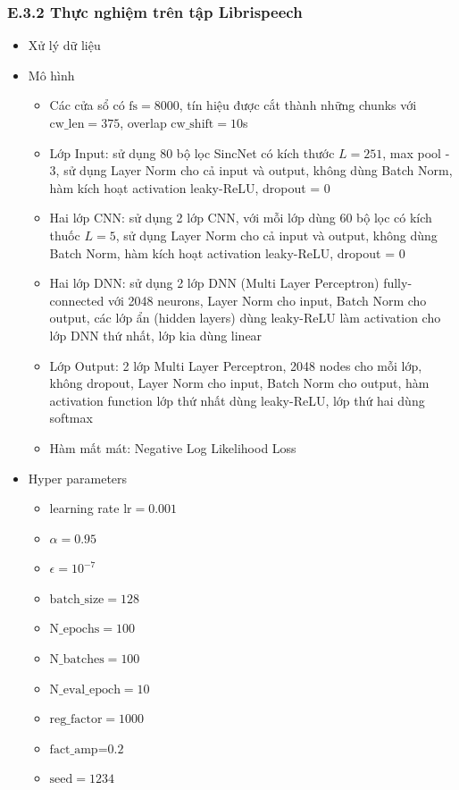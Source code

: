 \documentclass{article}
\begin{document}
	\subsubsection{E.3.2 Thực nghiệm trên tập Librispeech}
	\begin{itemize}
		\item Xử lý dữ liệu
		\item Mô hình 
		\begin{itemize}
			\item Các cửa sổ có $\text{fs} = 8000$, tín hiệu được cắt thành những chunks với $\text{cw\_len}=375$, overlap $\text{cw\_shift}=10$s
			\item Lớp Input: sử dụng 80 bộ lọc SincNet có kích thước $L=251$, max pool - 3, sử dụng Layer Norm cho cả input và output, không dùng Batch Norm, hàm kích hoạt activation leaky-ReLU, dropout = 0
			\item Hai lớp CNN: sử dụng 2 lớp CNN, với mỗi lớp dùng 60 bộ lọc có kích thuốc $L=5$, sử dụng Layer Norm cho cả input và output, không dùng Batch Norm, hàm kích hoạt activation leaky-ReLU, dropout = 0
			\item Hai lớp DNN: sử dụng 2 lớp DNN (Multi Layer Perceptron) fully-connected với 2048 neurons, Layer Norm cho input, Batch Norm cho output, các lớp ẩn (hidden layers) dùng leaky-ReLU làm activation cho lớp DNN thứ nhất, lớp kia dùng linear
			\item Lớp Output: 2 lớp Multi Layer Perceptron, 2048 nodes cho mỗi lớp, không dropout, Layer Norm cho input, Batch Norm cho output, hàm activation function lớp thứ nhất dùng leaky-ReLU, lớp thứ hai dùng softmax
			\item Hàm mất mát: Negative Log Likelihood Loss
		\end{itemize}
		\item Hyper parameters
		\begin{itemize}
			\item learning rate $\text{lr} = 0.001$
			\item $\alpha = 0.95$
			\item $\epsilon = 10^{-7}$
			\item $\text{batch\_size}=128$
			\item $\text{N\_epochs}=100$
			\item $\text{N\_batches}=100$
			\item $\text{N\_eval\_epoch}=10$
			\item $\text{reg\_factor}=1000$
			\item $\text{fact\_amp=0.2}$
			\item $\text{seed}=1234$
		\end{itemize}
	\end{itemize}
\end{document}

